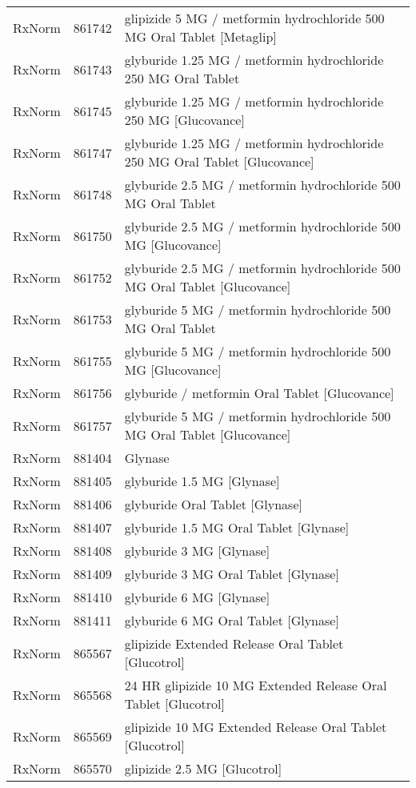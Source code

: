 \begin{longtable}{p{}p{}p{}}
  RxNorm & 861742 & glipizide 5 MG / metformin hydrochloride 500 MG Oral Tablet [Metaglip] \\ 
  RxNorm & 861743 & glyburide 1.25 MG / metformin hydrochloride 250 MG Oral Tablet \\ 
  RxNorm & 861745 & glyburide 1.25 MG / metformin hydrochloride 250 MG [Glucovance] \\ 
  RxNorm & 861747 & glyburide 1.25 MG / metformin hydrochloride 250 MG Oral Tablet [Glucovance] \\ 
  RxNorm & 861748 & glyburide 2.5 MG / metformin hydrochloride 500 MG Oral Tablet \\ 
  RxNorm & 861750 & glyburide 2.5 MG / metformin hydrochloride 500 MG [Glucovance] \\ 
  RxNorm & 861752 & glyburide 2.5 MG / metformin hydrochloride 500 MG Oral Tablet [Glucovance] \\ 
  RxNorm & 861753 & glyburide 5 MG / metformin hydrochloride 500 MG Oral Tablet \\ 
  RxNorm & 861755 & glyburide 5 MG / metformin hydrochloride 500 MG [Glucovance] \\ 
  RxNorm & 861756 & glyburide / metformin Oral Tablet [Glucovance] \\ 
  RxNorm & 861757 & glyburide 5 MG / metformin hydrochloride 500 MG Oral Tablet [Glucovance] \\ 
  RxNorm & 881404 & Glynase \\ 
  RxNorm & 881405 & glyburide 1.5 MG [Glynase] \\ 
  RxNorm & 881406 & glyburide Oral Tablet [Glynase] \\ 
  RxNorm & 881407 & glyburide 1.5 MG Oral Tablet [Glynase] \\ 
  RxNorm & 881408 & glyburide 3 MG [Glynase] \\ 
  RxNorm & 881409 & glyburide 3 MG Oral Tablet [Glynase] \\ 
  RxNorm & 881410 & glyburide 6 MG [Glynase] \\ 
  RxNorm & 881411 & glyburide 6 MG Oral Tablet [Glynase] \\ 
  RxNorm & 865567 & glipizide Extended Release Oral Tablet [Glucotrol] \\ 
  RxNorm & 865568 & 24 HR glipizide 10 MG Extended Release Oral Tablet [Glucotrol] \\ 
  RxNorm & 865569 & glipizide 10 MG Extended Release Oral Tablet [Glucotrol] \\ 
  RxNorm & 865570 & glipizide 2.5 MG [Glucotrol] \\ 

\end{longtable}
